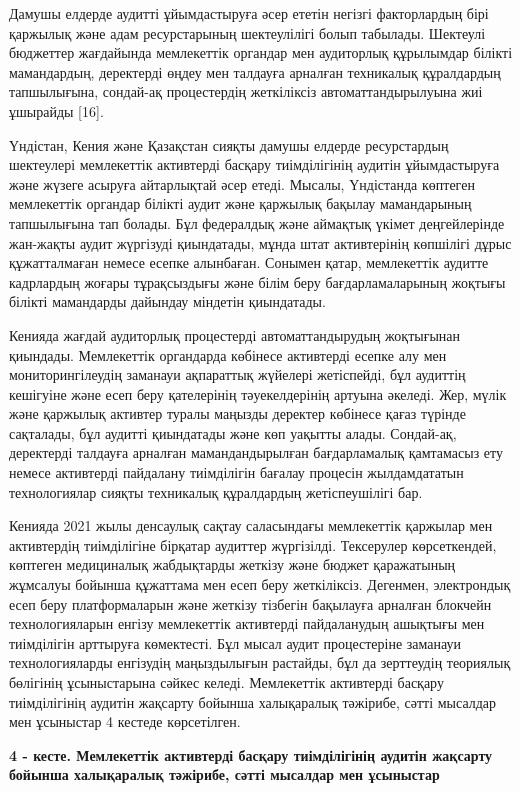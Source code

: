 Дамушы елдерде аудитті ұйымдастыруға әсер ететін негізгі факторлардың
бірі қаржылық және адам ресурстарының шектеулілігі болып табылады.
Шектеулі бюджеттер жағдайында мемлекеттік органдар мен аудиторлық
құрылымдар білікті мамандардың, деректерді өңдеу мен талдауға арналған
техникалық құралдардың тапшылығына, сондай-ақ процестердің жеткіліксіз
автоматтандырылуына жиі ұшырайды {[}16{]}.

Үндістан, Кения және Қазақстан сияқты дамушы елдерде ресурстардың
шектеулері мемлекеттік активтерді басқару тиімділігінің аудитін
ұйымдастыруға және жүзеге асыруға айтарлықтай әсер етеді. Мысалы,
Үндістанда көптеген мемлекеттік органдар білікті аудит және қаржылық
бақылау мамандарының тапшылығына тап болады. Бұл федералдық және
аймақтық үкімет деңгейлерінде жан-жақты аудит жүргізуді қиындатады,
мұнда штат активтерінің көпшілігі дұрыс құжатталмаған немесе есепке
алынбаған. Сонымен қатар, мемлекеттік аудитте кадрлардың жоғары
тұрақсыздығы және білім беру бағдарламаларының жоқтығы білікті
мамандарды дайындау міндетін қиындатады.

Кенияда жағдай аудиторлық процестерді автоматтандырудың жоқтығынан
қиындады. Мемлекеттік органдарда көбінесе активтерді есепке алу мен
мониторингілеудің заманауи ақпараттық жүйелері жетіспейді, бұл аудиттің
кешігуіне және есеп беру қателерінің тәуекелдерінің артуына әкеледі.
Жер, мүлік және қаржылық активтер туралы маңызды деректер көбінесе қағаз
түрінде сақталады, бұл аудитті қиындатады және көп уақытты алады.
Сондай-ақ, деректерді талдауға арналған мамандандырылған бағдарламалық
қамтамасыз ету немесе активтерді пайдалану тиімділігін бағалау процесін
жылдамдататын технологиялар сияқты техникалық құралдардың жетіспеушілігі
бар.

Кенияда 2021 жылы денсаулық сақтау саласындағы мемлекеттік қаржылар мен
активтердің тиімділігіне бірқатар аудиттер жүргізілді. Тексерулер
көрсеткендей, көптеген медициналық жабдықтарды жеткізу және бюджет
қаражатының жұмсалуы бойынша құжаттама мен есеп беру жеткіліксіз.
Дегенмен, электрондық есеп беру платформаларын және жеткізу тізбегін
бақылауға арналған блокчейн технологияларын енгізу мемлекеттік
активтерді пайдаланудың ашықтығы мен тиімділігін арттыруға көмектесті.
Бұл мысал аудит процестеріне заманауи технологияларды енгізудің
маңыздылығын растайды, бұл да зерттеудің теориялық бөлігінің
ұсыныстарына сәйкес келеді. Мемлекеттік активтерді басқару тиімділігінің
аудитін жақсарту бойынша халықаралық тәжірибе, сәтті мысалдар мен
ұсыныстар 4 кестеде көрсетілген.

{\bfseries 4 - кесте. Мемлекеттік активтерді басқару тиімділігінің аудитін
жақсарту бойынша халықаралық тәжірибе, сәтті мысалдар мен ұсыныстар}

